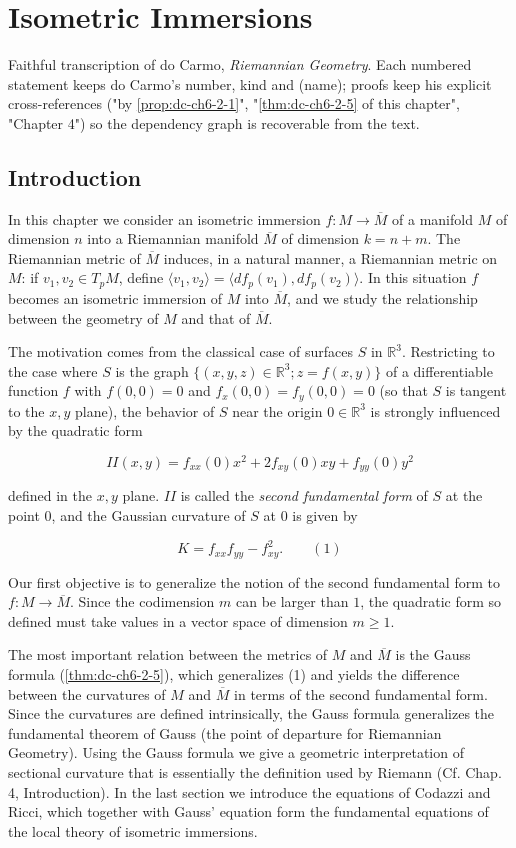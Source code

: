 \chapter{Isometric Immersions}
\label{chap:dc-isometric-immersions}

Faithful transcription of do Carmo, \emph{Riemannian Geometry}. Each numbered
statement keeps do Carmo's number, kind and (name); proofs keep his explicit
cross-references ("by \cref{prop:dc-ch6-2-1}", "\cref{thm:dc-ch6-2-5} of this chapter", "Chapter 4")
so the dependency graph is recoverable from the text.

\section{Introduction}

In this chapter we consider an isometric immersion $f:M\to\overline{M}$ of a manifold
$M$ of dimension $n$ into a Riemannian manifold $\overline{M}$ of dimension
$k=n+m$. The Riemannian metric of $\overline{M}$ induces, in a natural manner, a
Riemannian metric on $M$: if $v_1,v_2\in T_pM$, define
$\langle v_1,v_2\rangle=\langle df_p(v_1),df_p(v_2)\rangle$. In this situation $f$
becomes an isometric immersion of $M$ into $\overline{M}$, and we study the
relationship between the geometry of $M$ and that of $\overline{M}$.

The motivation comes from the classical case of surfaces $S$ in $\mathbb{R}^3$.
Restricting to the case where $S$ is the graph
$\{(x,y,z)\in\mathbb{R}^3;z=f(x,y)\}$ of a differentiable function $f$ with
$f(0,0)=0$ and $f_x(0,0)=f_y(0,0)=0$ (so that $S$ is tangent to the $x,y$ plane),
the behavior of $S$ near the origin $0\in\mathbb{R}^3$ is strongly influenced by
the quadratic form

$$
\mathit{II}(x,y)=f_{xx}(0)x^2+2f_{xy}(0)xy+f_{yy}(0)y^2
$$

defined in the $x,y$ plane. $\mathit{II}$ is called the \emph{second fundamental form}
of $S$ at the point $0$, and the Gaussian curvature of $S$ at $0$ is given by

$$
K=f_{xx}f_{yy}-f_{xy}^2.\qquad(1)
$$

Our first objective is to generalize the notion of the second fundamental form to
$f:M\to\overline{M}$. Since the codimension $m$ can be larger than $1$, the
quadratic form so defined must take values in a vector space of dimension
$m\geq 1$.

The most important relation between the metrics of $M$ and $\overline{M}$ is the
Gauss formula (\cref{thm:dc-ch6-2-5}), which generalizes (1) and yields the difference
between the curvatures of $M$ and $\overline{M}$ in terms of the second
fundamental form. Since the curvatures are defined intrinsically, the Gauss
formula generalizes the fundamental theorem of Gauss (the point of departure for
Riemannian Geometry). Using the Gauss formula we give a geometric interpretation
of sectional curvature that is essentially the definition used by Riemann
(Cf. Chap. 4, Introduction). In the last section we introduce the equations of
Codazzi and Ricci, which together with Gauss' equation form the fundamental
equations of the local theory of isometric immersions.

